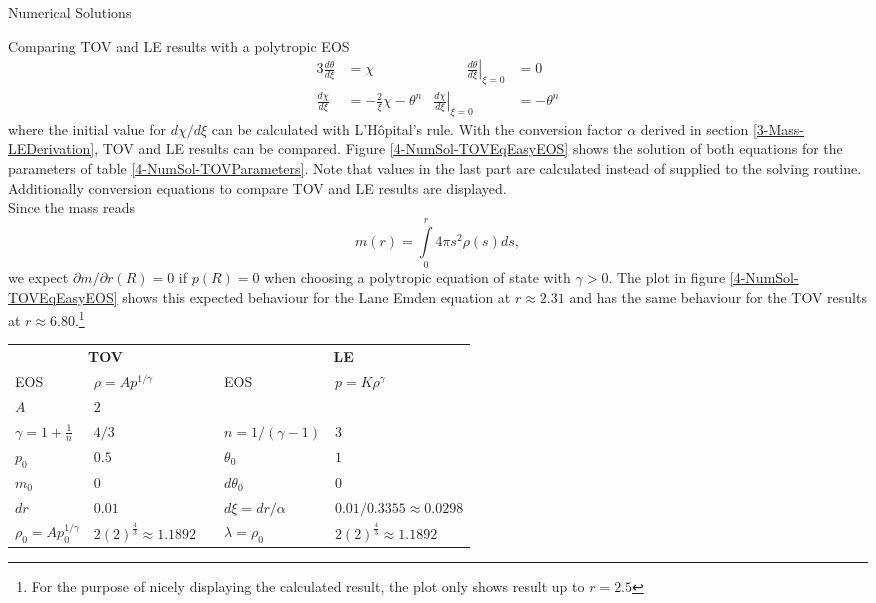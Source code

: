 \begin{section}{Numerical Solutions}
\begin{subsection}{Comparing TOV and LE results with a polytropic EOS}
\begin{alignat}{3}
	\frac{d\theta}{d\xi} &= \chi &\hspace{1cm} \left.\frac{d\theta}{d\xi}\right|_{\xi=0} &= 0\\
	\frac{d\chi}{d\xi} &= -\frac{2}{\xi}\chi-\theta^n & \left.\frac{d\chi}{d\xi}\right|_{\xi=0} &= -\theta^n
	\label{4-NumSol-LE-Substitution}
\end{alignat}
where the initial value for $d\chi/d\xi$ can be calculated with L'Hôpital's rule. With the conversion factor $\alpha$ derived in section \ref{3-Mass-LEDerivation}, TOV and LE results can be compared. Figure \ref{4-NumSol-TOVEqEasyEOS} shows the solution of both equations for the parameters of table \ref{4-NumSol-TOVParameters}. Note that values in the last part are calculated instead of supplied to the solving routine. Additionally conversion equations to compare TOV and LE results are displayed.\\
Since the mass reads
\begin{equation}
	m(r) = \int\limits_0^r 4\pi s^2\rho(s)ds,
\end{equation}
we expect $\partial m/\partial r(R)=0$ if $p(R)=0$ when choosing a polytropic equation of state with $\gamma>0$. The plot in figure \ref{4-NumSol-TOVEqEasyEOS} shows this expected behaviour for the Lane Emden equation at $r\approx2.31$ and has the same behaviour for the TOV results at $r\approx6.80$.\footnote{For the purpose of nicely displaying the calculated result, the plot only shows result up to $r=2.5$}
\begin{table}[H]
	\renewcommand{\arraystretch}{1.2}
	\centering
	\begin{tabular}{@{}llcll@{}}
		\toprule
		\multicolumn{2}{c}{\textbf{TOV}} & \phantom{abc} &\multicolumn{2}{c}{\textbf{LE}}\\
		\cmidrule{1-2} \cmidrule{4-5}
		EOS & $\rho=Ap^{1/\gamma}$ && EOS & $p=K\rho^{\gamma}$\\
		$A$ & $2$ & & \\
		$\gamma=1+\frac{1}{n}$ & $4/3$ && $n=1/(\gamma-1)$ & $3$\\
		$p_0$ & $0.5$ && $\theta_0$ & $1$\\
		$m_0$ & $0$ && $d\theta_0$ & $0$\\
		$dr$ & $0.01$ && $d\xi=dr/\alpha$ & $0.01/0.3355\approx0.0298$\\
		\cmidrule{1-2} \cmidrule{4-5}
		$\rho_0=Ap_0^{1/\gamma}$ & $2(2)^{\frac{4}{3}}\approx1.1892$ && $\lambda=\rho_0$ & $2(2)^{\frac{4}{3}}\approx1.1892$\\

\end{tabular}
\end{table}
\end{subsection}
\end{section}
